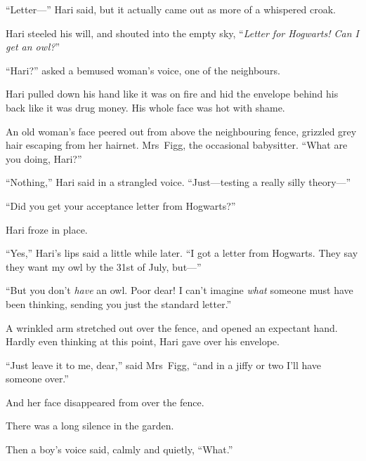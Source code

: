 “Letter—” Hari said, but it actually came out as more of a whispered croak.

Hari steeled his will, and shouted into the empty sky, “\emph{Letter for Hogwarts! Can I get an owl?}”

“Hari?” asked a bemused woman’s voice, one of the neighbours.

Hari pulled down his hand like it was on fire and hid the envelope behind his back like it was drug money. His whole face was hot with shame.

An old woman’s face peered out from above the neighbouring fence, grizzled grey hair escaping from her hairnet. Mrs~Figg, the occasional babysitter. “What are you doing, Hari?”

“Nothing,” Hari said in a strangled voice. “Just—testing a really silly theory—”

“Did you get your acceptance letter from Hogwarts?”

Hari froze in place.

“Yes,” Hari’s lips said a little while later. “I got a letter from Hogwarts. They say they want my owl by the 31st of July, but—”

“But you don’t \emph{have} an owl. Poor dear! I can’t imagine \emph{what} someone must have been thinking, sending you just the standard letter.”

A wrinkled arm stretched out over the fence, and opened an expectant hand. Hardly even thinking at this point, Hari gave over his envelope.

“Just leave it to me, dear,” said Mrs~Figg, “and in a jiffy or two I’ll have someone over.”

And her face disappeared from over the fence.

There was a long silence in the garden.

Then a boy’s voice said, calmly and quietly, “What.”
